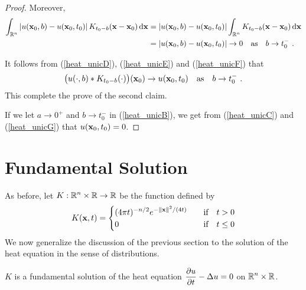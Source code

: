 \begin{proof}
Moreover,
\begin{align}
\int_{\mathbb{R}^n} \left|u(\mathbf{x}_0,b) - u(\mathbf{x}_0,t_0) \right|
K_{t_0-b}(\mathbf{x}-\mathbf{x}_0) \,\mathrm{d}{\mathbf{x}}
& = \left|u(\mathbf{x}_0,b) - u(\mathbf{x}_0,t_0) \right| \int_{\mathbb{R}^n}  
K_{t_0-b}(\mathbf{x}-\mathbf{x}_0) \,\mathrm{d}{\mathbf{x}} \nonumber \\
& = \left|u(\mathbf{x}_0,b) - u(\mathbf{x}_0,t_0) \right| \to 0
\quad \text{as} \quad b \to t_0^- \ . \label{heat_unicF}
\end{align}

It follows from (\ref{heat_unicD}), (\ref{heat_unicE}) and
(\ref{heat_unicF}) that
\begin{equation} \label{heat_unicG}
\big(u(\cdot, b) \ast K_{t_0-b}(\cdot)\big)(\mathbf{x}_0)
\to u(\mathbf{x}_0,t_0)
\quad \text{as}\quad b \to t_0^- \ .
\end{equation}
This complete the prove of the second claim.

 If we let $a\to 0^+$ and $b\to t_0^-$ in (\ref{heat_unicB}), we get
from (\ref{heat_unicC}) and (\ref{heat_unicG}) that
$u(\mathbf{x}_0, t_0) = 0$.
\end{proof}

\section{Fundamental Solution} \label{SectHeatFundSol}

As before, let $\displaystyle K:\mathbb{R}^n \times \mathbb{R} \rightarrow \mathbb{R}$ be
the function defined by
\[
K(\mathbf{x},t) =
\begin{cases}
\displaystyle (4\pi t)^{-n/2} e^{-\|\mathbf{x}\|^2/(4t)} & \quad 
\text{if} \quad t>0 \\
0 &  \quad \text{if} \quad t\leq 0
\end{cases}
\]
We now generalize the discussion of the previous section to the
solution of the heat equation in the sense of distributions.

\begin{theorem}
$K$ is a fundamental solution of the heat equation
$\displaystyle \frac{\partial{u}}{\partial t} - \Delta u = 0$ on $\displaystyle \mathbb{R}^n\times \mathbb{R}$.
\end{theorem}

